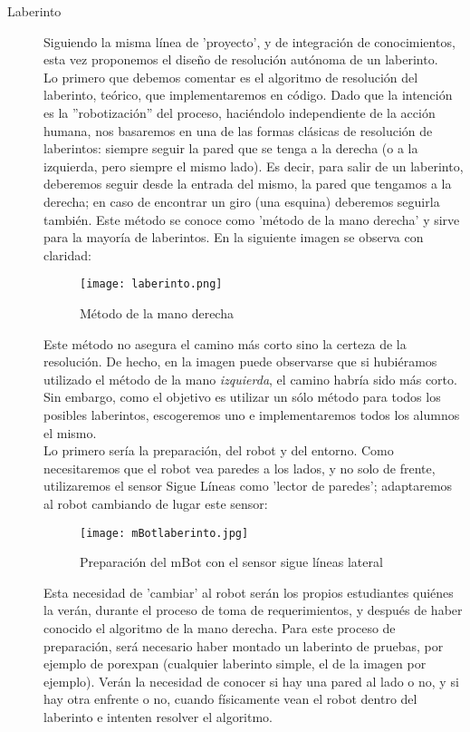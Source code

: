 \begin{description}
	\item[Laberinto] \label{ej:laberinto}
	Siguiendo la misma línea de 'proyecto', y de integración de conocimientos, esta vez proponemos el diseño de resolución autónoma de un laberinto. \\
	Lo primero que debemos comentar es el algoritmo de resolución del laberinto, teórico, que implementaremos en código. Dado que la intención es la ''robotización'' del proceso, haciéndolo independiente de la acción humana, nos basaremos en una de las formas clásicas de resolución de laberintos: siempre seguir la pared que se tenga a la derecha (o a la izquierda, pero siempre el mismo lado). Es decir, para salir de un laberinto, deberemos seguir desde la entrada del mismo, la pared que tengamos a la derecha; en caso de encontrar un giro (una esquina) deberemos seguirla también. Este método se conoce como 'método de la mano derecha' y sirve para la mayoría de laberintos. En la siguiente imagen se observa con claridad:
	\begin{figure}[H]
		\texttt{[image: laberinto.png]}
		\centering
		\label{img:laberinto}
		\caption{Método de la mano derecha}
	\end{figure}
	Este método no asegura el camino más corto sino la certeza de la resolución. De hecho, en la imagen puede observarse que si hubiéramos utilizado el método de la mano \textit{izquierda}, el camino habría sido más corto. Sin embargo, como el objetivo es utilizar un sólo método para todos los posibles laberintos, escogeremos uno e implementaremos todos los alumnos el mismo. \\
	Lo primero sería la preparación, del robot y del entorno. Como necesitaremos que el robot vea paredes a los lados, y no solo de frente, utilizaremos el sensor Sigue Líneas como 'lector de paredes'; adaptaremos al robot cambiando de lugar este sensor:
	\begin{figure}[H]
		\texttt{[image: mBotlaberinto.jpg]}
		\centering
		\label{img:mBotlaberinto}
		\caption{Preparación del mBot con el sensor sigue líneas lateral}
	\end{figure}
	Esta necesidad de 'cambiar' al robot serán los propios estudiantes quiénes la verán, durante el proceso de toma de requerimientos, y después de haber conocido el algoritmo de la mano derecha. Para este proceso de preparación, será necesario haber montado un laberinto de pruebas, por ejemplo de porexpan (cualquier laberinto simple, el de la imagen por ejemplo). Verán la necesidad de conocer si hay una pared al lado o no, y si hay otra enfrente o no, cuando físicamente vean el robot dentro del laberinto e intenten resolver el algoritmo. \\

\end{description}
